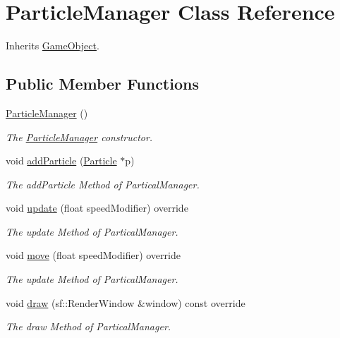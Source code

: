\hypertarget{class_particle_manager}{\section{Particle\+Manager Class Reference}
\label{class_particle_manager}
}


Inherits \hyperlink{class_game_object}{Game\+Object}.

\subsection*{Public Member Functions}
\begin{DoxyCompactItemize}
\item 
\hyperlink{class_particle_manager_a36f2371b06ef7bd96fc1e0cb1fcebd66}{Particle\+Manager} ()
\begin{DoxyCompactList}\small\item\em The \hyperlink{class_particle_manager}{Particle\+Manager} constructor. \end{DoxyCompactList}\item 
void \hyperlink{class_particle_manager_a651901462992745401596956c790d87d}{add\+Particle} (\hyperlink{class_particle}{Particle} $\ast$p)
\begin{DoxyCompactList}\small\item\em The add\+Particle Method of Partical\+Manager. \end{DoxyCompactList}\item 
void \hyperlink{class_particle_manager_a2c786926fc1cd9992c518b3ea4ee07cb}{update} (float speed\+Modifier) override
\begin{DoxyCompactList}\small\item\em The update Method of Partical\+Manager. \end{DoxyCompactList}\item 
void \hyperlink{class_particle_manager_a77357f72908d4fa5eea451baee1b354d}{move} (float speed\+Modifier) override
\begin{DoxyCompactList}\small\item\em The update Method of Partical\+Manager. \end{DoxyCompactList}\item 
void \hyperlink{class_particle_manager_a03682007d1bedb0f00795026f14a517c}{draw} (sf\+::\+Render\+Window \&window) const override
\begin{DoxyCompactList}\small\item\em The draw Method of Partical\+Manager. \end{DoxyCompactList}\item 

\end{DoxyCompactItemize}
